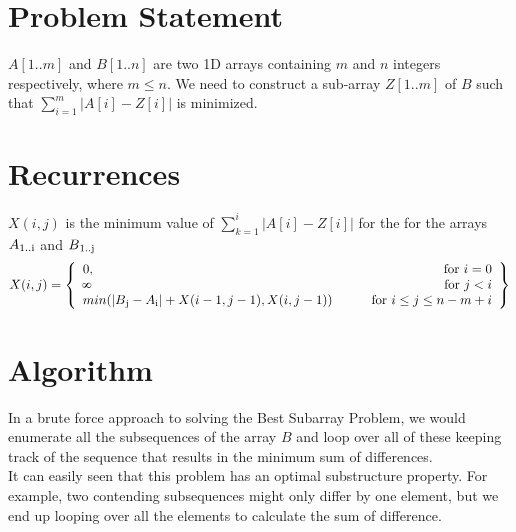 \documentclass[12pt,letterpaper]{article}
\def\infinity{\rotatebox{90}{8}}
\begin{document}
\section*{Problem Statement}
    $A[1..m]$ and $B[1..n]$ are two 1D arrays containing $m$ and $n$ integers
    respectively, where $m\le n$.
    We need to construct a sub-array $Z[1..m]$ of $B$ such that
    $\sum\limits_{i=1}^{m} \big|A[i]-Z[i]\big|$ is minimized.
\section*{Recurrences}

$X(i, j)$ is the minimum value of $\sum\limits_{k=1}^{i} \big|A[i]-Z[i]\big|$ for the for the arrays $A\textsubscript{1..i}$ and $B\textsubscript{1..j}$
\begin{equation*}
    X(i,j) = \left\{\begin{array}{lr}
        0, & \text{for } i = 0\\
        \infinity \qquad & \text{for }  j < i \\
        min(\left| B\textsubscript{j} - A\textsubscript{i} \right| + X(i-1, j-1), X(i, j-1)) \qquad & \text{for }  i \leq j \leq n-m+i
        \end{array}\right\}
\end{equation*}

\section*{Algorithm}

    In a brute force approach to solving the Best Subarray Problem, we
    would enumerate all the subsequences of the array $B$ and loop over all of these keeping track of the sequence that results in the minimum sum of differences.\\
    It can easily seen that this problem has an optimal substructure property. For example, two contending subsequences might only differ by one element, but we end up looping over all the elements to calculate the sum of difference.
\end{document}
